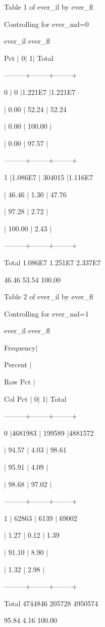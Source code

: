\begin{multicols}{2}
\textsf{Table 1 of ever{\_}il by ever{\_}fl}

\textsf{Controlling for ever{\_}md=0}

\textsf{ever{\_}il ever{\_}fl}

\textsf{Pct $\vert $ 0$\vert $ 1$\vert $ Total}

\textsf{---------+--------+--------+}

\textsf{0 $\vert $ 0 $\vert $1.221E7 $\vert $1.221E7}

\textsf{$\vert $ 0.00 $\vert $ 52.24 $\vert $ 52.24}

\textsf{$\vert $ 0.00 $\vert $ 100.00 $\vert $}

\textsf{$\vert $ 0.00 $\vert $ 97.57 $\vert $}

\textsf{---------+--------+--------+}

\textsf{1 $\vert $1.086E7 $\vert $ 304015 $\vert $1.116E7}

\textsf{$\vert $ 46.46 $\vert $ 1.30 $\vert $ 47.76}

\textsf{$\vert $ 97.28 $\vert $ 2.72 $\vert $}

\textsf{$\vert $ 100.00 $\vert $ 2.43 $\vert $}

\textsf{---------+--------+--------+}

\textsf{Total 1.086E7 1.251E7 2.337E7}

\textsf{46.46 53.54 100.00}

\textsf{Table 2 of ever{\_}il by ever{\_}fl}

\textsf{Controlling for ever{\_}md=1}

\textsf{ever{\_}il ever{\_}fl}

\textsf{Frequency$\vert $}

\textsf{Percent $\vert $}

\textsf{Row Pct $\vert $}

\textsf{Col Pct $\vert $ 0$\vert $ 1$\vert $ Total}

\textsf{---------+--------+--------+}

\textsf{0 $\vert $4681983 $\vert $ 199589 $\vert $4881572}

\textsf{$\vert $ 94.57 $\vert $ 4.03 $\vert $ 98.61}

\textsf{$\vert $ 95.91 $\vert $ 4.09 $\vert $}

\textsf{$\vert $ 98.68 $\vert $ 97.02 $\vert $}

\textsf{---------+--------+--------+}

\textsf{1 $\vert $ 62863 $\vert $ 6139 $\vert $ 69002}

\textsf{$\vert $ 1.27 $\vert $ 0.12 $\vert $ 1.39}

\textsf{$\vert $ 91.10 $\vert $ 8.90 $\vert $}

\textsf{$\vert $ 1.32 $\vert $ 2.98 $\vert $}

\textsf{---------+--------+--------+}

\textsf{Total 4744846 205728 4950574}

\textsf{95.84 4.16 100.00}

\end{multicols}


